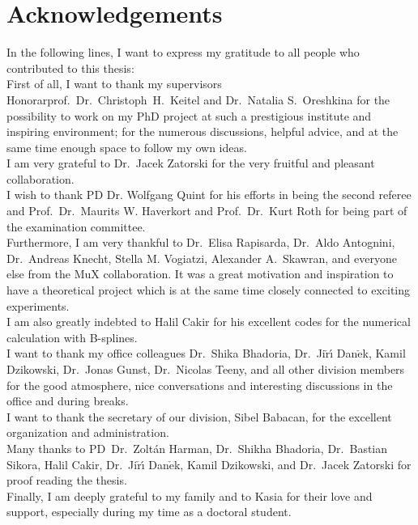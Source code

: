 \chapter*{Acknowledgements}

In the following lines, I want to express my gratitude to all people who contributed to this thesis:\\
First of all, I want to thank my supervisors Honorarprof.~Dr.~Christoph~H.~Keitel and Dr.~Natalia S.~Oreshkina for the possibility to work on my PhD project at such a prestigious institute and inspiring environment; for the numerous discussions, helpful advice, and at the same time enough space to follow my own ideas.\\
I am very grateful to Dr.~Jacek Zatorski for the very fruitful and pleasant collaboration.\\
I wish to thank PD Dr. Wolfgang Quint for his efforts in being the second referee and Prof.~Dr.~Maurits W. Haverkort and Prof.~Dr.~Kurt Roth for being part of the examination committee.\\
Furthermore, I am very thankful to Dr.~Elisa Rapisarda, Dr.~Aldo Antognini, Dr.~Andreas Knecht, Stella M. Vogiatzi, Alexander A.~Skawran, and everyone else from the MuX collaboration. It was a great motivation and inspiration to have a theoretical project which is at the same time closely connected to exciting experiments.\\
I am also greatly indebted to Halil Cakir for his excellent codes for the numerical calculation with B-splines.\\
I want to thank my  office colleagues Dr.~Shika Bhadoria, Dr.~Ji$\check{\text{r}}${\'\i} Dan$\check{\text{e}}$k, Kamil Dzikowski, Dr.~Jonas Gunst, Dr.~Nicolas Teeny, and all other division members for the good atmosphere, nice conversations and interesting discussions in the office and during breaks.\\
I want to thank the secretary of our division, Sibel Babacan, for the excellent organization and administration.\\
Many thanks to PD~Dr.~Zoltán Harman, Dr.~Shikha Bhadoria, Dr.~Bastian Sikora, Halil Cakir, Dr.~Ji$\check{\text{r}}${\'\i} Dan$\check{\text{e}}$k, Kamil Dzikowski, and Dr.~Jacek Zatorski for proof reading the thesis.\\%
Finally, I am deeply grateful to my family and to Kasia for their love and support, especially during my time as a doctoral student.
%



